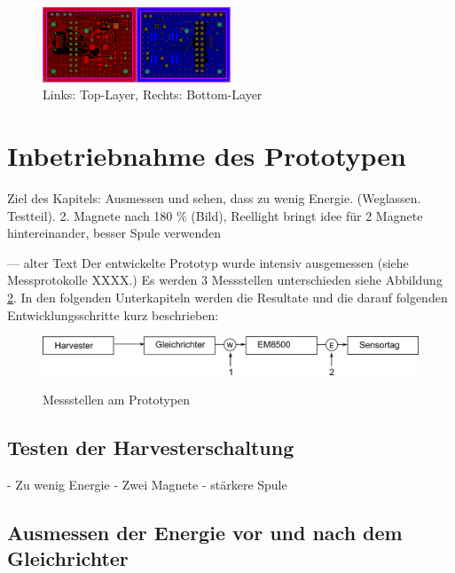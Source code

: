 \begin{figure}[ht]
    \includegraphics[width=0.5\textwidth]{3Vorgehen/imag/Layout_Redesign.png}
    \caption{Links: Top-Layer, Rechts: Bottom-Layer}\label{layout_redesign} 
\end{figure}


\section{Inbetriebnahme des Prototypen}
Ziel des Kapitels: Ausmessen und sehen, dass zu wenig Energie. (Weglassen. Testteil). 2. Magnete nach 180 \% (Bild), Reellight bringt idee für 2 Magnete hintereinander, besser Spule verwenden

--- alter Text
Der entwickelte Prototyp wurde intensiv ausgemessen (siehe Messprotokolle XXXX.)  Es werden 3 Messstellen unterschieden siehe Abbildung \ref{EnergieMessungStellen}. In den folgenden Unterkapiteln werden die Resultate und die darauf folgenden Entwicklungsschritte kurz beschrieben:

\begin{figure}[ht]
  \includegraphics[width=1.0\textwidth]{3Vorgehen/imag/EnergiemessungStellen.png}\label{EnergieMessungStellen} 
  \caption{Messstellen am Prototypen}
\end{figure}

\subsection{Testen der Harvesterschaltung}

- Zu wenig Energie
- Zwei Magnete
- stärkere Spule

\subsection{Ausmessen der Energie vor und nach dem Gleichrichter}


